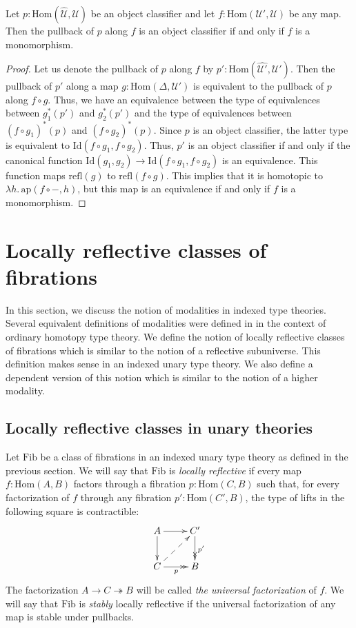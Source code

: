 \documentclass[reqno]{mscs}
\newcommand{\fs}[1]{\mathrm{#1}}
\newcommand{\Hom}{\fs{Hom}}
\newcommand{\Id}{\fs{Id}}
\newcommand{\refl}{\fs{refl}}
\newcommand{\pmap}{\fs{ap}}
\newcommand{\Fib}{\fs{Fib}}
\numberwithin{figure}{section}
\begin{document}
\begin{prop}
Let $p : \Hom(\widehat{\mathcal{U}},\mathcal{U})$ be an object classifier and let $f : \Hom(\mathcal{U}',\mathcal{U})$ be any map.
Then the pullback of $p$ along $f$ is an object classifier if and only if $f$ is a monomorphism.
\end{prop}
\begin{proof}
Let us denote the pullback of $p$ along $f$ by $p' : \Hom(\widehat{\mathcal{U}'},\mathcal{U}')$.
Then the pullback of $p'$ along a map $g : \Hom(\Delta,\mathcal{U}')$ is equivalent to the pullback of $p$ along $f \circ g$.
Thus, we have an equivalence between the type of equivalences between $g_1^*(p')$ and $g_2^*(p')$ and the type of equivalences between $(f \circ g_1)^*(p)$ and $(f \circ g_2)^*(p)$.
Since $p$ is an object classifier, the latter type is equivalent to $\Id(f \circ g_1, f \circ g_2)$.
Thus, $p'$ is an object classifier if and only if the canonical function $\Id(g_1,g_2) \to \Id(f \circ g_1, f \circ g_2)$ is an equivalence.
This function maps $\refl(g)$ to $\refl(f \circ g)$.
This implies that it is homotopic to $\lambda h.\,\pmap(f \circ -, h)$, but this map is an equivalence if and only if $f$ is a monomorphism.
\end{proof}

\section{Locally reflective classes of fibrations}
\label{sec:refl-fib}

In this section, we discuss the notion of modalities in indexed type theories.
Several equivalent definitions of modalities were defined in \cite{modality-hott} in the context of ordinary homotopy type theory.
We define the notion of locally reflective classes of fibrations which is similar to the notion of a reflective subuniverse.
This definition makes sense in an indexed unary type theory.
We also define a dependent version of this notion which is similar to the notion of a higher modality.

\subsection{Locally reflective classes in unary theories}

Let $\Fib$ be a class of fibrations in an indexed unary type theory as defined in the previous section.
We will say that $\Fib$ is \emph{locally reflective} if every map $f : \Hom(A,B)$ factors through a fibration $p : \Hom(C,B)$
such that, for every factorization of $f$ through any fibration $p' : \Hom(C',B)$, the type of lifts in the following square is contractible:
\[ \xymatrix{ A \ar[r] \ar[d]                   & C' \ar@{->>}[d]^{p'} \\
              C \ar@{->>}[r]_p \ar@{-->}[ur]    & B
            } \]
The factorization $A \to C \twoheadrightarrow B$ will be called \emph{the universal factorization} of $f$.
We will say that $\Fib$ is \emph{stably} locally reflective if the universal factorization of any map is stable under pullbacks.
\end{document}
